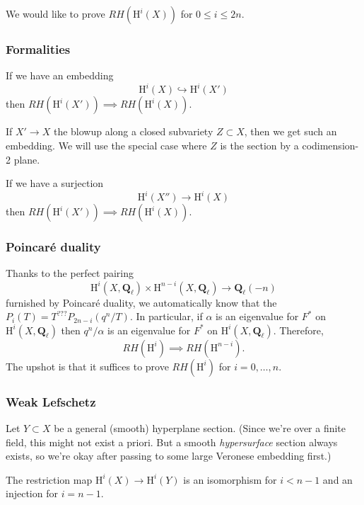 \documentclass[letterpaper,11pt]{article}
\newcommand{\Q}{\mathbf{Q}}
\newcommand{\mrm}[1]{\mathrm{#1}}
\begin{document}
 We would like to prove $RH(\mrm{H}^i(X))$ for $0 \leq i \leq 2n$. 

\subsubsection{Formalities}

If we have an embedding 
\[
\mrm{H}^i(X) \hookrightarrow \mrm{H}^i(X')
\]
then $RH(\mrm{H}^i(X')) \implies RH(\mrm{H}^i(X))$. 

\begin{example}
If $X' \rightarrow X$ the blowup along a closed subvariety $Z \subset X$, then we get such an embedding. We will use the special case where $Z$ is the section by a codimension-2 plane. 
\end{example}

If we have a surjection
\[
\mrm{H}^i(X'') \rightarrow \mrm{H}^i(X)
\]
then $RH(\mrm{H}^i(X')) \implies RH(\mrm{H}^i(X))$. 

\subsubsection{Poincar\'{e} duality}

Thanks to the perfect pairing 
\[
\mrm{H}^i(X, \Q_{\ell}) \times \mrm{H}^{n-i}(X, \Q_{\ell}) \rightarrow \Q_{\ell}(-n)
\]
furnished by Poincar\'{e} duality, we automatically know that the $P_i(T) = T^{???}P_{2n-i}(q^n/T)$. In particular, if $\alpha$ is an eigenvalue for $F^*$ on $\mrm{H}^i(X, \Q_{\ell})$ then $q^n/\alpha$ is an eigenvalue for $F^*$ on $\mrm{H}^i(X, \Q_{\ell})$. Therefore, 
\[
RH(\mrm{H}^i) \implies RH(\mrm{H}^{n-i}).
\]
The upshot is that it suffices to prove $RH(\mrm{H}^i)$ for $i = 0, \ldots, n$. 

\subsubsection{Weak Lefschetz}

Let $Y \subset X$ be a general (smooth) hyperplane section. (Since we're over a finite field, this might not exist a priori. But a smooth \emph{hypersurface} section always exists, so we're okay after passing to some large Veronese embedding first.) 

\begin{thm}
The restriction map $\mrm{H}^i(X) \rightarrow \mrm{H}^i(Y)$ is an isomorphism for $i < n-1$ and an injection for $i=n-1$. 
\end{thm}
\end{document}
